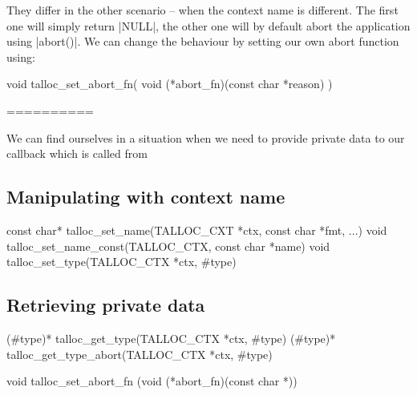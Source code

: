 They differ in the other scenario -- when the context name is different. The
first one will simply return |NULL|, the other one will by default abort the
application using |abort()|. We can change the behaviour by setting our own
abort function using:

\begin{funcproto}
void talloc_set_abort_fn(
  void (*abort_fn)(const char *reason)
)
\end{funcproto}


==========

We can find ourselves in a situation when we need to provide private data to our
callback which is called from 


\subsection{Manipulating with context name}

\begin{funcproto}
const char* talloc_set_name(TALLOC_CXT *ctx,
                            const char *fmt, ...)
void talloc_set_name_const(TALLOC_CTX,
                           const char *name)
void talloc_set_type(TALLOC_CTX *ctx, #type)
\end{funcproto}
\funclistend

\subsection{Retrieving private data}

\begin{funcproto}
(#type)* talloc_get_type(TALLOC_CTX *ctx, #type)
(#type)* talloc_get_type_abort(TALLOC_CTX *ctx, #type)
\end{funcproto}
\funclistend

\begin{funcproto}
void talloc_set_abort_fn
  (void (*abort_fn)(const char *))
\end{funcproto}